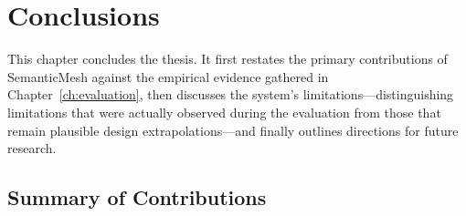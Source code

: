 \chapter{Conclusions}
\label{ch:conclusions}

This chapter concludes the thesis. It first restates the primary contributions of SemanticMesh against the empirical evidence gathered in Chapter~\ref{ch:evaluation}, then discusses the system's limitations---distinguishing limitations that were actually observed during the evaluation from those that remain plausible design extrapolations---and finally outlines directions for future research.

\section{Summary of Contributions}
\label{sec:conclusion:contributions}

